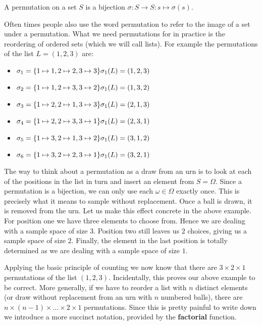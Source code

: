 \documentclass[a4paper,11pt,leqno]{report}
\begin{document}
\begin{Definition} 
A permutation on a set $ S $ is a bijection $ \sigma : S \rightarrow S : s \mapsto \sigma(s) $.
\end{Definition}

Often times people also use the word permutation to refer to the image of a set under a permutation. What we
need permutations for in practice is the reordering of ordered sets (which we will call lists). For example
the permutations of the list $ L = (1,2,3) $ are:
\begin{itemize}
\item $ \sigma_{1} = \{1 \mapsto 1, 2 \mapsto 2, 3 \mapsto 3 \} \hfill \sigma_{1}(L) = (1,2,3) $
\item $ \sigma_{2} = \{1 \mapsto 1, 2 \mapsto 3, 3 \mapsto 2 \} \hfill \sigma_{1}(L) = (1,3,2) $
\item $ \sigma_{3} = \{1 \mapsto 2, 2 \mapsto 1, 3 \mapsto 3 \} \hfill \sigma_{1}(L) = (2,1,3) $
\item $ \sigma_{4} = \{1 \mapsto 2, 2 \mapsto 3, 3 \mapsto 1 \} \hfill \sigma_{1}(L) = (2,3,1) $
\item $ \sigma_{5} = \{1 \mapsto 3, 2 \mapsto 1, 3 \mapsto 2 \} \hfill \sigma_{1}(L) = (3,1,2) $
\item $ \sigma_{6} = \{1 \mapsto 3, 2 \mapsto 2, 3 \mapsto 1 \} \hfill \sigma_{1}(L) = (3,2,1) $
\end{itemize}

The way to think about a permutation as a draw from an urn is to look at each of the positions in the list in
turn and insert an element from $ S = \Omega $. Since a permutation is a bijection, we can only use each
$ \omega \in \Omega $ exactly once. This is precisely what it means to sample without replacement. Once a ball
is drawn, it is removed from the urn. Let us make this effect concrete in the above example. For position one
we have three elements to choose from. Hence we are dealing with a sample space of size $ 3 $. Position two
still leaves us $ 2 $ choices, giving us a sample space of size $ 2 $. Finally, the element in the last position
is totally determined as we are dealing with a sample space of size $ 1 $.

Applying the basic principle of counting we now know that there are $ 3 \times 2 \times 1 $ permutations of the list
$ (1,2,3) $. Incidentally, this proves our above example to be correct. More generally, if we have to reorder
a list with $ n $ distinct elements (or draw without replacement from an urn with $ n $ numbered balls), there
are $ n \times (n-1) \times \ldots \times 2 \times 1 $ permutations. Since this is pretty painful to write down
we introduce a more succinct notation, provided by the \textbf{factorial} function.
\end{document}

